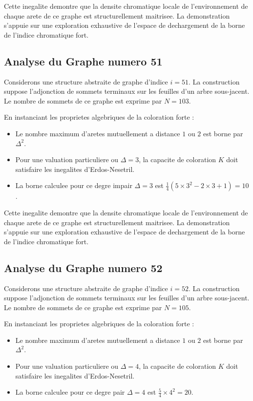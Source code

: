 \documentclass[11pt,a4paper]{article}
\begin{document}
Cette inegalite demontre que la densite chromatique locale de l'environnement de chaque arete de ce graphe est structurellement maitrisee. La demonstration s'appuie sur une exploration exhaustive de l'espace de dechargement de la borne de l'indice chromatique fort.

\subsection{Analyse du Graphe numero 51}
Considerons une structure abstraite de graphe d'indice $i = 51$. La construction suppose l'adjonction de sommets terminaux sur les feuilles d'un arbre sous-jacent. Le nombre de sommets de ce graphe est exprime par $N = 103$.

En instanciant les proprietes algebriques de la coloration forte :
\begin{itemize}
\item Le nombre maximum d'aretes mutuellement a distance $1$ ou $2$ est borne par $\Delta^2$.
\item Pour une valuation particuliere ou $\Delta = 3$, la capacite de coloration $K$ doit satisfaire les inegalites d'Erdos-Nesetril.
\item La borne calculee pour ce degre impair $\Delta = 3$ est $\frac{1}{4}(5 \times 3^2 - 2 \times 3 + 1) = 10$.
\end{itemize}

Cette inegalite demontre que la densite chromatique locale de l'environnement de chaque arete de ce graphe est structurellement maitrisee. La demonstration s'appuie sur une exploration exhaustive de l'espace de dechargement de la borne de l'indice chromatique fort.

\subsection{Analyse du Graphe numero 52}
Considerons une structure abstraite de graphe d'indice $i = 52$. La construction suppose l'adjonction de sommets terminaux sur les feuilles d'un arbre sous-jacent. Le nombre de sommets de ce graphe est exprime par $N = 105$.

En instanciant les proprietes algebriques de la coloration forte :
\begin{itemize}
\item Le nombre maximum d'aretes mutuellement a distance $1$ ou $2$ est borne par $\Delta^2$.
\item Pour une valuation particuliere ou $\Delta = 4$, la capacite de coloration $K$ doit satisfaire les inegalites d'Erdos-Nesetril.
\item La borne calculee pour ce degre pair $\Delta = 4$ est $\frac{5}{4} \times 4^2 = 20$.
\end{itemize}
\end{document}
